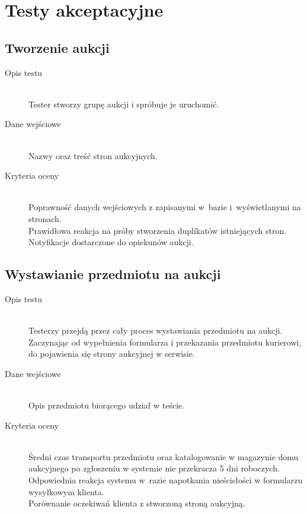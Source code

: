 \documentclass[10pt,a4paper]{article}
\begin{document}
\section{Testy akceptacyjne}

\subsection{Tworzenie aukcji}
\begin{description}
  \item[Opis testu] \hfill \\
    Tester stworzy grupę aukcji i spróbuje je uruchomić.
  \item[Dane wejściowe] \hfill \\
    Nazwy oraz treść stron aukcyjnych.
  \item[Kryteria oceny] \hfill \\
    Poprawność danych wejściowych z zapisanymi w~bazie i~wyświetlanymi na
    stronach.\\
    Prawidłowa reakcja na próby stworzenia duplikatów istniejących stron.\\
    Notyfikacje dostarczone do opiekunów aukcji.
\end{description}

\subsection{Wystawianie przedmiotu na aukcji}
\begin{description}
  \item[Opis testu] \hfill \\
    Testerzy przejdą przez cały proces wystawiania przedmiotu na aukcji.
    Zaczynając od wypełnienia formularza i przekazania przedmiotu kurierowi,
    do pojawienia się strony aukcyjnej w serwisie.
  \item[Dane wejściowe] \hfill \\
    Opis przedmiotu biorącego udział w teście.
  \item[Kryteria oceny] \hfill \\
    Średni czas transportu przedmiotu oraz katalogowanie w magazynie domu
    aukcyjnego po zgłoszeniu w systemie nie przekracza 5 dni roboczych.\\
    Odpowiednia reakcja systemu w~razie napotkania nieścisłości w formularzu
    wysyłkowym klienta.\\
    Porównanie oczekiwań klienta z stworzoną stroną aukcyjną.
\end{description}
\end{document}
